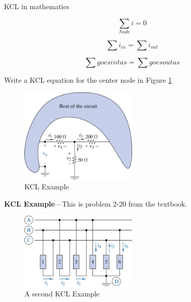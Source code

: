 \documentclass{handout}
\begin{document}

KCL in mathematics

\begin{equation}
\sum_{Node} i = 0 
\end{equation}

\begin{equation}
\sum i_{in} = \sum i_{out}
\end{equation}

\begin{equation}
\sum goesintas = \sum goesoutas
\end{equation}

Write a KCL equation for the center node in Figure \ref{fig: KCL}
\begin{figure}[h b t]
\centering
\includegraphics[width=0.5\textwidth]{KCL.jpg}
\caption{KCL Example}
\label{fig: KCL}
\end{figure}



\newpage
\textbf{KCL Example}---This is problem 2-20 from the textbook.

\begin{figure}[h b t]
\centering
\includegraphics[width=0.5\textwidth]{KCL_Example.jpg}
\caption{A second KCL Example}
\label{fig: KCL_Example}
\end{figure}
\end{document}
